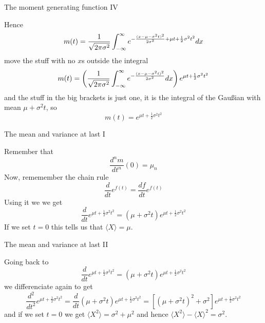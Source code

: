 \documentclass{beamer}
\begin{document}
\begin{frame}{The moment generating function IV}

Hence
\color{reddish}
$$
m(t)=\frac{1}{\sqrt{2\pi\sigma^2}}\int_{-\infty}^\infty e^{-\frac{(x-\mu-\sigma^2 t)^2}{2\sigma^2}\color{greenish}{}+\mu t + \frac{1}{2}\sigma^2 t^2\color{reddish}}dx
$$
\color{black}
move the \color{greenish}{}stuff with no $x$s\color{black}{} outside the integral\color{reddish}
$$
m(t)=\left(\color{blueish}{}\frac{1}{\sqrt{2\pi\sigma^2}}\int_{-\infty}^\infty e^{-\frac{(x-\mu-\sigma^2 t)^2}{2\sigma^2}}dx\color{reddish}\right)\color{greenish}{} e^{\mu t + \frac{1}{2}\sigma^2 t^2}
$$
\color{black} and the \color{blueish}{}stuff in the big brackets\color{black}{} is just one,  it is the integral of the Gau\ss{}ian with mean \color{reddish}$\mu+\sigma^2 t$\color{black}{}, so
\color{purple}
$$
m(t)= e^{\mu t + \frac{1}{2}\sigma^2 t^2}
$$
\color{black}

\end{frame}

\begin{frame}{The mean and variance at last I}

Remember that 
\color{reddish}
$$
\frac{d^nm}{dt^n}(0)=\mu_n
$$
\color{black}
Now, rememember the chain rule
\color{greenish}{}
$$
\frac{d}{dt}e^{f(t)}=\frac{df}{dt}e^{f(t)}
$$
\color{black}
Using it we we get
\color{greenish}{}
$$
\frac{d}{dt}e^{\mu t + \frac{1}{2}\sigma^2 t^2}=(\mu+\sigma^2 t)e^{\mu t + \frac{1}{2}\sigma^2 t^2}
$$
\color{black}{}
If we set \color{reddish}$t=0$\color{black}{} this tells us that \color{reddish}$\langle X\rangle =\mu$\color{black}{}.


\end{frame}


\begin{frame}{The mean and variance at last II}

Going back to
\color{reddish}{}
$$
\frac{d}{dt}e^{\mu t + \frac{1}{2}\sigma^2 t^2}=(\mu+\sigma^2 t)e^{\mu t + \frac{1}{2}\sigma^2 t^2}
$$
\color{black}{}
we differenciate again to get
\color{reddish}
$$
\frac{d^2}{dt^2}e^{\mu t + \frac{1}{2}\sigma^2 t^2}=\frac{d}{dt}(\mu+\sigma^2 t)e^{\mu t + \frac{1}{2}\sigma^2 t^2}=[(\mu+\sigma^2 t)^2+\sigma^2]e^{\mu t + \frac{1}{2}\sigma^2 t^2}
$$
\color{black}{}
and if we set \color{reddish}$t=0$\color{black}{} we get \color{reddish}$\langle X^2\rangle =\sigma^2+\mu^2$\color{black}{} and
hence \color{reddish}$\langle X^2\rangle-\langle X\rangle^2=\sigma^2$\color{black}{}.

\end{frame}
\end{document}
